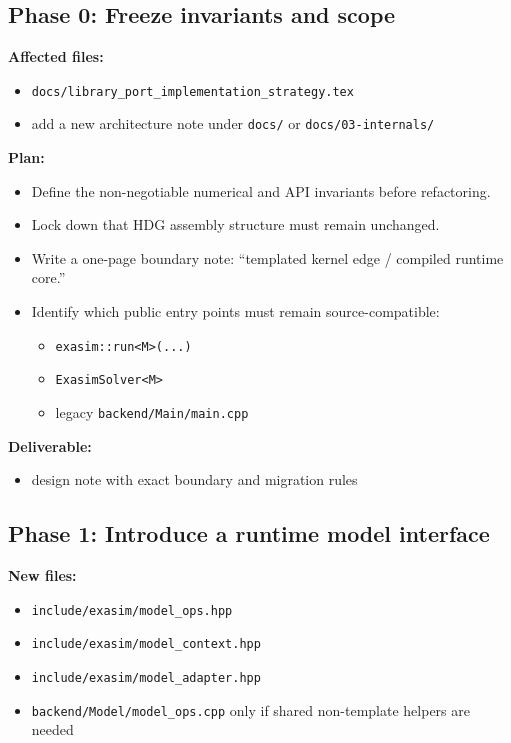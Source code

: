 \documentclass[11pt]{article}
\begin{document}
\subsection*{Phase 0: Freeze invariants and scope}

\textbf{Affected files:}
\begin{itemize}[leftmargin=*]
\item \texttt{docs/library\_port\_implementation\_strategy.tex}
\item add a new architecture note under \texttt{docs/} or \texttt{docs/03-internals/}
\end{itemize}

\textbf{Plan:}
\begin{itemize}[leftmargin=*]
\item Define the non-negotiable numerical and API invariants before refactoring.
\item Lock down that HDG assembly structure must remain unchanged.
\item Write a one-page boundary note: ``templated kernel edge / compiled runtime core.''
\item Identify which public entry points must remain source-compatible:
\begin{itemize}[leftmargin=*]
\item \texttt{exasim::run<M>(...)}
\item \texttt{ExasimSolver<M>}
\item legacy \texttt{backend/Main/main.cpp}
\end{itemize}
\end{itemize}

\textbf{Deliverable:}
\begin{itemize}[leftmargin=*]
\item design note with exact boundary and migration rules
\end{itemize}

\subsection*{Phase 1: Introduce a runtime model interface}

\textbf{New files:}
\begin{itemize}[leftmargin=*]
\item \texttt{include/exasim/model\_ops.hpp}
\item \texttt{include/exasim/model\_context.hpp}
\item \texttt{include/exasim/model\_adapter.hpp}
\item \texttt{backend/Model/model\_ops.cpp} only if shared non-template helpers are needed
\end{itemize}
\end{document}

